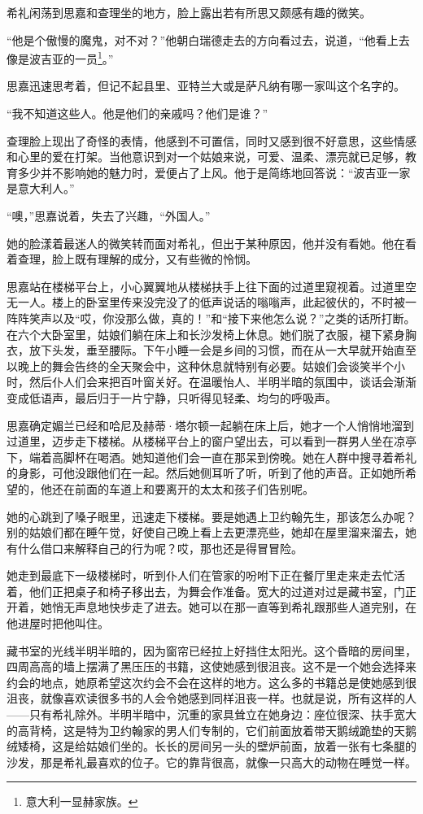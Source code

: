 \par 希礼闲荡到思嘉和查理坐的地方，脸上露出若有所思又颇感有趣的微笑。
\par “他是个傲慢的魔鬼，对不对？”他朝白瑞德走去的方向看过去，说道，“他看上去像是波吉亚的一员\footnote{意大利一显赫家族。}。”
\par 思嘉迅速思考着，但记不起县里、亚特兰大或是萨凡纳有哪一家叫这个名字的。
\par “我不知道这些人。他是他们的亲戚吗？他们是谁？”
\par 查理脸上现出了奇怪的表情，他感到不可置信，同时又感到很不好意思，这些情感和心里的爱在打架。当他意识到对一个姑娘来说，可爱、温柔、漂亮就已足够，教育多少并不影响她的魅力时，爱便占了上风。他于是简练地回答说：“波吉亚一家是意大利人。”
\par “噢，”思嘉说着，失去了兴趣，“外国人。”
\par 她的脸漾着最迷人的微笑转而面对希礼，但出于某种原因，他并没有看她。他在看着查理，脸上既有理解的成分，又有些微的怜悯。
\par  
\par 思嘉站在楼梯平台上，小心翼翼地从楼梯扶手上往下面的过道里窥视着。过道里空无一人。楼上的卧室里传来没完没了的低声说话的嗡嗡声，此起彼伏的，不时被一阵阵笑声以及“哎，你没那么做，真的！”和“接下来他怎么说？”之类的话所打断。在六个大卧室里，姑娘们躺在床上和长沙发椅上休息。她们脱了衣服，褪下紧身胸衣，放下头发，垂至腰际。下午小睡一会是乡间的习惯，而在从一大早就开始直至以晚上的舞会告终的全天聚会中，这种休息就特别有必要。姑娘们会谈笑半个小时，然后仆人们会来把百叶窗关好。在温暖怡人、半明半暗的氛围中，谈话会渐渐变成低语声，最后归于一片宁静，只听得见轻柔、均匀的呼吸声。
\par 思嘉确定媚兰已经和哈尼及赫蒂·塔尔顿一起躺在床上后，她才一个人悄悄地溜到过道里，迈步走下楼梯。从楼梯平台上的窗户望出去，可以看到一群男人坐在凉亭下，端着高脚杯在喝酒。她知道他们会一直在那呆到傍晚。她在人群中搜寻着希礼的身影，可他没跟他们在一起。然后她侧耳听了听，听到了他的声音。正如她所希望的，他还在前面的车道上和要离开的太太和孩子们告别呢。
\par 她的心跳到了嗓子眼里，迅速走下楼梯。要是她遇上卫约翰先生，那该怎么办呢？别的姑娘们都在睡午觉，好使自己晚上看上去更漂亮些，她却在屋里溜来溜去，她有什么借口来解释自己的行为呢？哎，那也还是得冒冒险。
\par 她走到最底下一级楼梯时，听到仆人们在管家的吩咐下正在餐厅里走来走去忙活着，他们正把桌子和椅子移出去，为舞会作准备。宽大的过道对过是藏书室，门正开着，她悄无声息地快步走了进去。她可以在那一直等到希礼跟那些人道完别，在他进屋时把他叫住。
\par 藏书室的光线半明半暗的，因为窗帘已经拉上好挡住太阳光。这个昏暗的房间里，四周高高的墙上摆满了黑压压的书籍，这使她感到很沮丧。这不是一个她会选择来约会的地点，她原希望这次约会不会在这样的地方。这么多的书籍总是使她感到很沮丧，就像喜欢读很多书的人会令她感到同样沮丧一样。也就是说，所有这样的人——只有希礼除外。半明半暗中，沉重的家具耸立在她身边：座位很深、扶手宽大的高背椅，这是特为卫约翰家的男人们专制的，它们前面放着带天鹅绒跪垫的天鹅绒矮椅，这是给姑娘们坐的。长长的房间另一头的壁炉前面，放着一张有七条腿的沙发，那是希礼最喜欢的位子。它的靠背很高，就像一只高大的动物在睡觉一样。
